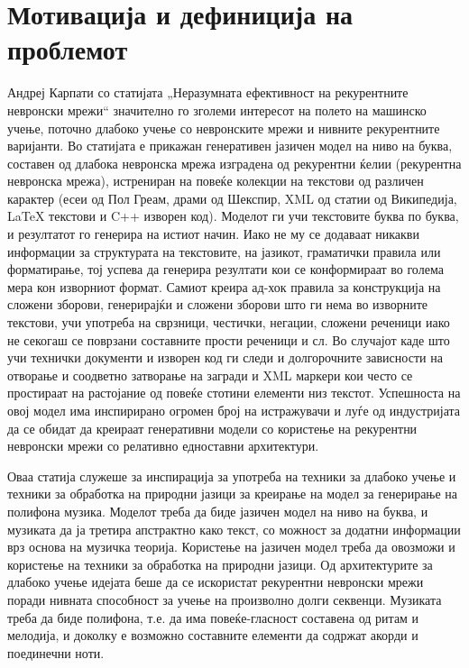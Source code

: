 \chapter{Мотивација и дефиниција на проблемот}
\label{ch:motivacija}

Андреј Карпати со статијата „Неразумната ефективност на рекурентните невронски мрежи“ \cite{AndrejKarpathy2015} значително го зголеми интересот на полето на машинско учење, поточно длабоко учење со невронските мрежи и нивните рекурентните варијанти. Во статијата е прикажан генеративен јазичен модел на ниво на буква, составен од длабока невронска мрежа изградена од рекурентни ќелии (рекурентна невронска мрежа), истрениран на повеќе колекции на текстови од различен карактер (есеи од Пол Греам, драми од Шекспир, XML од статии од Википедија, LaTeX текстови и C++ изворен код). Моделот ги учи текстовите буква по буква, и резултатот го генерира на истиот начин. Иако не му се додаваат никакви информации за структурата на текстовите, на јазикот, граматички правила или форматирање, тој успева да генерира резултати кои се конформираат во голема мера кон изворниот формат. Самиот креира ад-хок правила за конструкција на сложени зборови, генерирајќи и сложени зборови што ги нема во изворните текстови, учи употреба на сврзници, честички, негации, сложени реченици иако не секогаш се поврзани составните прости реченици и сл. Во случајот каде што учи технички документи и изворен код ги следи и долгорочните зависности на отворање и соодветно затворање на загради и XML маркери кои често се простираат на растојание од повеќе стотини елементи низ текстот. Успешноста на овој модел има инспирирано огромен број на истражувачи и луѓе од индустријата да се обидат да креираат генеративни модели со користење на рекурентни невронски мрежи со релативно едноставни архитектури. 

Оваа статија служеше за инспирација за употреба на техники за длабоко учење и техники за обработка на природни јазици за креирање на модел за генерирање на полифона музика. Моделот треба да биде јазичен модел на ниво на буква, и музиката да ја третира апстрактно како текст, со можност за додатни информации врз основа на музичка теорија. Користење на јазичен модел треба да овозможи и користење на техники за обработка на природни јазици. Од архитектурите за длабоко учење идејата беше да се искористат рекурентни невронски мрежи поради нивната способност за учење на произволно долги секвенци. Музиката треба да биде полифона, т.е. да има повеќе-гласност составена од ритам и мелодија, и доколку е возможно составните елементи да содржат акорди и поединечни ноти.


